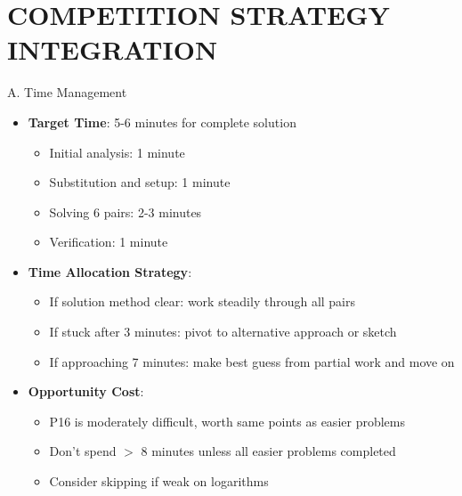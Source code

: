 \documentclass[12pt]{article}
\begin{document}
\section{COMPETITION STRATEGY INTEGRATION}

\begin{competitionbox}{A. Time Management}
\begin{itemize}[leftmargin=*]
    \item \textbf{Target Time}: 5-6 minutes for complete solution
    \begin{itemize}
        \item Initial analysis: 1 minute
        \item Substitution and setup: 1 minute
        \item Solving 6 pairs: 2-3 minutes
        \item Verification: 1 minute
    \end{itemize}
    
    \item \textbf{Time Allocation Strategy}:
    \begin{itemize}
        \item If solution method clear: work steadily through all pairs
        \item If stuck after 3 minutes: pivot to alternative approach or sketch
        \item If approaching 7 minutes: make best guess from partial work and move on
    \end{itemize}
    
    \item \textbf{Opportunity Cost}:
    \begin{itemize}
        \item P16 is moderately difficult, worth same points as easier problems
        \item Don't spend $>$ 8 minutes unless all easier problems completed
        \item Consider skipping if weak on logarithms
    \end{itemize}
\end{itemize}
\end{competitionbox}
\end{document}
